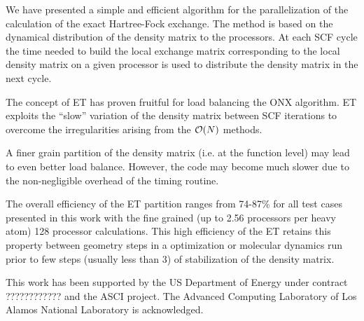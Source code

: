 \documentclass[twocolumn,showkeys,showpacs,preprintnumbers,amsmath,amssymb]{revtex4}
\begin{document}
 We have presented a simple and efficient algorithm for 
 the parallelization of the calculation of the exact Hartree-Fock
 exchange. The method is based on the dynamical distribution 
 of the density matrix to the processors. At each SCF cycle the
 time needed to build the local exchange matrix corresponding
 to the local density matrix on a given processor is used to
 distribute the density matrix in the next cycle. 

 The concept of ET has proven fruitful for load balancing the ONX 
 algorithm. ET exploits the ``slow'' variation of the density matrix 
 between SCF iterations to overcome the irregularities arising 
 from the ${\cal O}(N)$ methods.

 A finer grain partition of the density matrix (i.e. at the function level)
 may lead to even better load balance. However, the code 
 may become much slower due to the non-negligible overhead 
 of the timing routine.

 The overall efficiency of the ET partition ranges from 74-87\%
 for all test cases presented in this work with the fine grained
 (up to 2.56 processors per heavy atom) 128 processor calculations.
 This high efficiency of the ET retains this property between geometry steps
 in a optimization or molecular dynamics run prior
 to few steps (usually less than 3) of stabilization of the density matrix.

\begin{acknowledgments}
 This work has been supported by the US Department of Energy
 under contract ???????????? and the ASCI project.
 The Advanced Computing Laboratory of Los
 Alamos National Laboratory is acknowledged.
\end{acknowledgments}

%
\newpage

\end{document}
